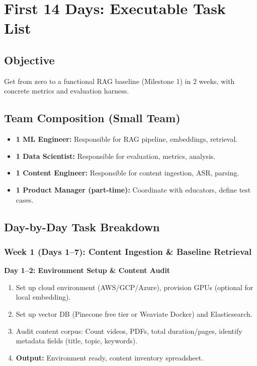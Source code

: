 \documentclass[11pt,letterpaper]{article}
\begin{document}
\newpage

\section{First 14 Days: Executable Task List}

\subsection{Objective}
Get from zero to a functional RAG baseline (Milestone 1) in 2 weeks, with concrete metrics and evaluation harness.

\subsection{Team Composition (Small Team)}
\begin{itemize}
\item \textbf{1 ML Engineer:} Responsible for RAG pipeline, embeddings, retrieval.
\item \textbf{1 Data Scientist:} Responsible for evaluation, metrics, analysis.
\item \textbf{1 Content Engineer:} Responsible for content ingestion, ASR, parsing.
\item \textbf{1 Product Manager (part-time):} Coordinate with educators, define test cases.
\end{itemize}

\subsection{Day-by-Day Task Breakdown}

\subsubsection{Week 1 (Days 1--7): Content Ingestion \& Baseline Retrieval}

\textbf{Day 1--2: Environment Setup \& Content Audit}
\begin{enumerate}
\item Set up cloud environment (AWS/GCP/Azure), provision GPUs (optional for local embedding).
\item Set up vector DB (Pinecone free tier or Weaviate Docker) and Elasticsearch.
\item Audit content corpus: Count videos, PDFs, total duration/pages, identify metadata fields (title, topic, keywords).
\item \textbf{Output:} Environment ready, content inventory spreadsheet.
\end{enumerate}
\end{document}
